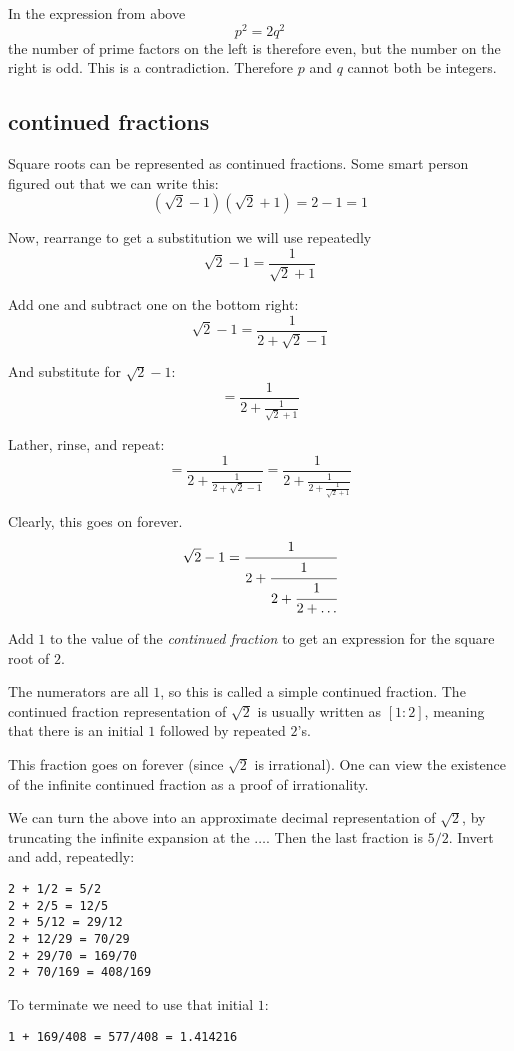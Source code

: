 \documentclass[11pt, oneside]{article}
\begin{document}
In the expression from above
\[ p^2 = 2q^2 \]
the number of prime factors on the left is therefore even, but the number on the right is odd.  This is a contradiction.  Therefore $p$ and $q$ cannot both be integers.

\subsection*{continued fractions}
Square roots can be represented as continued fractions.  Some smart person figured out that we can write this:
\[ (\sqrt{2} - 1)(\sqrt{2} + 1) = 2 - 1 = 1 \]

Now, rearrange to get a substitution we will use repeatedly
\[ \sqrt{2} - 1 = \frac{1}{\sqrt{2} + 1} \]

Add one and subtract one on the bottom right:
\[ \sqrt{2} - 1 =  \frac{1}{2 + \sqrt{2} - 1} \]

And substitute for $\sqrt{2} - 1$:
\[ = \frac{1}{2 + \frac{1}{\sqrt{2} + 1}} \]

Lather, rinse, and repeat:
\[ = \frac{1}{2 + \frac{1}{2 + \sqrt{2} - 1}} = \frac{1}{2 + \frac{1}{2 + \frac{1}{\sqrt{2} + 1} }} \]

Clearly, this goes on forever.
\[ \sqrt{2} - 1 =  \cfrac{1}{2+\cfrac{1}{2+\cfrac{1}{2 + \dots}}}  \]

Add $1$ to the value of the \emph{continued fraction} to get an expression for the square root of $2$.

The numerators are all $1$, so this is called a simple continued fraction.  The continued fraction representation of $\sqrt{2}$ is usually written as $[1:2]$, meaning that there is an initial $1$ followed by repeated $2$'s.

This fraction goes on forever (since $\sqrt{2}$ is irrational).  One can view the existence of the infinite continued fraction as a proof of irrationality.

We can turn the above into an approximate decimal representation of $\sqrt{2}$, by truncating the infinite expansion at the $\dots$.  Then the last fraction is $5/2$.  Invert and add, repeatedly:

\begin{verbatim}
2 + 1/2 = 5/2
2 + 2/5 = 12/5
2 + 5/12 = 29/12
2 + 12/29 = 70/29
2 + 29/70 = 169/70
2 + 70/169 = 408/169
\end{verbatim}

To terminate we need to use that initial $1$:
\begin{verbatim}
1 + 169/408 = 577/408 = 1.414216
\end{verbatim}
\end{document}
